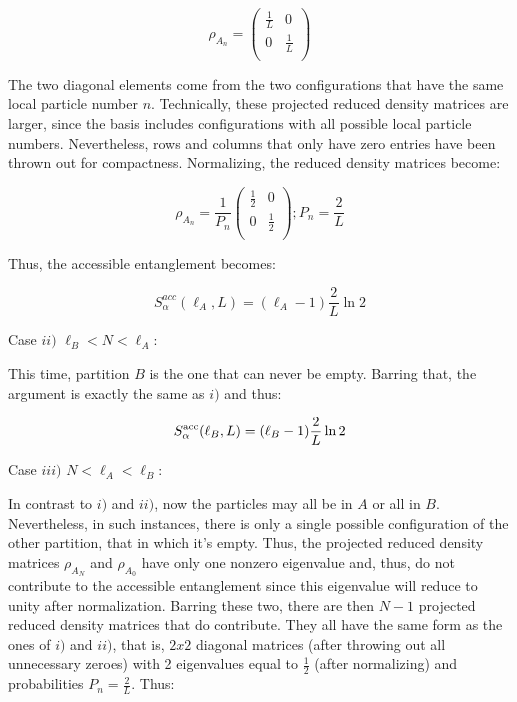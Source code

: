 \begin{equation}
\rho_{A_n} = \begin{pmatrix} 

\frac{1}{L} & 0 \\
0 & \frac{1}{L} \\

\end{pmatrix}
\end{equation}

The two diagonal elements come from the two configurations that have the same local particle number $n$. Technically, these projected reduced density matrices are larger, since the basis includes configurations with all possible local particle numbers. Nevertheless, rows and columns that only have zero entries have been thrown out for compactness. Normalizing, the reduced density matrices become:

\begin{equation}
\rho_{A_n} = \frac{1}{P_n} \begin{pmatrix} 

\frac{1}{2} & 0 \\
0 & \frac{1}{2} \\

\end{pmatrix} ; P_n = \frac{2}{L}
\end{equation}

Thus, the accessible entanglement becomes:

\begin{equation}
S_{\alpha}^{acc} (\ell_A, L) = (\ell_{A} - 1) \frac{2}{L} \ln{2}
\end{equation}

Case $ii)$ $\ell_{B} < N < \ell_{A}$:

This time, partition $B$ is the one that can never be empty. Barring that, the argument is exactly the same as $i)$ and thus:

\begin{equation}
S_{\alpha}^{\rm acc} (\ell_{B}, L) = (\ell_{B} - 1) \frac{2}{L} \ln{2}
\end{equation}

Case $iii)$ $N < \ell_{A} < \ell_{B}$:

In contrast to $i)$ and $ii)$, now the particles may all be in $A$ or all in $B$. Nevertheless, in such instances, there is only a single possible configuration of the other partition, that in which it's empty. Thus, the projected reduced density matrices $\rho_{A_N}$ and $\rho_{A_0}$ have only one nonzero eigenvalue and, thus, do not contribute to the accessible entanglement since this eigenvalue will reduce to unity after normalization. Barring these two, there are then $N-1$ projected reduced density matrices that do contribute. They all have the same form as the ones of $i)$ and $ii)$, that is, $2x2$ diagonal matrices (after throwing out all unnecessary zeroes) with 2 eigenvalues equal to $\frac{1}{2}$ (after normalizing) and probabilities $P_n = \frac{2}{L}$. Thus:

